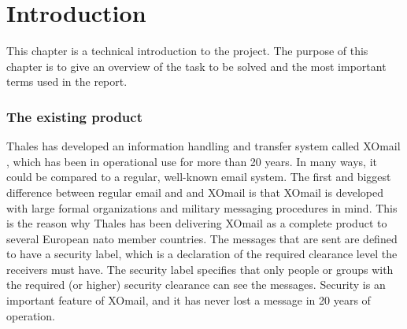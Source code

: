 \chapter{Introduction}

This chapter is a technical introduction to the project. The purpose of this chapter is to give an overview of the task to be solved and the most important terms used in the report.

\subsection*{The existing product}
Thales has developed an information handling and transfer system called XOmail \cite{bib:xomail}, which has been in operational use for more than 20 years. In many ways, it could be compared to a regular, well-known email system. The first and biggest difference between regular email and and XOmail is that XOmail is developed with large formal organizations and military messaging procedures in mind. This is the reason why Thales has been delivering XOmail as a complete product to several European \gls{nato} member countries.  
\newline
\newline
The messages that are sent are defined to have a security label, which is a declaration of the required clearance level the receivers must have. The security label specifies that only people or groups with the required (or higher) security clearance can see the messages. Security is an important feature of XOmail, and it has never lost a message in 20 years of operation. 

